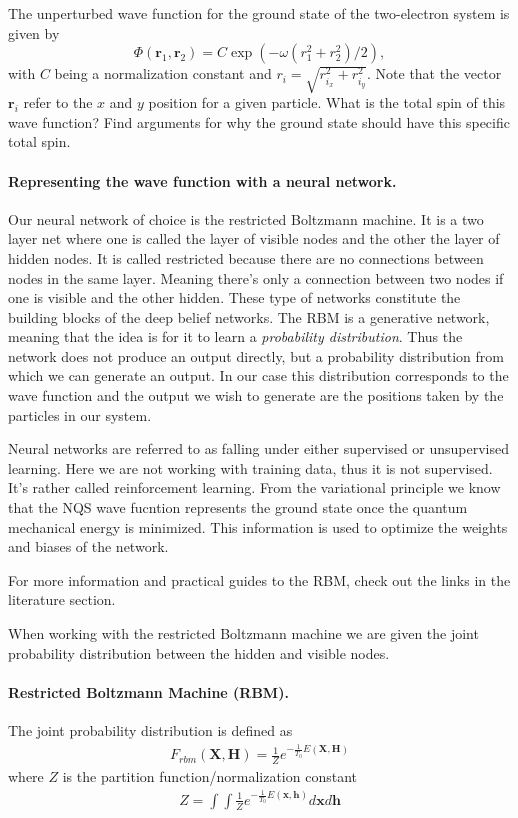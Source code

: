 \documentclass[%
oneside,                 %
final,                   %
10pt]{article}
\begin{document}
The unperturbed wave function for the ground state of the two-electron system is given by
\begin{equation*}
\Phi(\bm{r}_1,\bm{r}_2) = C\exp{\left(-\omega(r_1^2+r_2^2)/2\right)},
\end{equation*}
with $C$ being a normalization constant and $r_i = \sqrt{r_{i_x}^2+r_{i_y}^2}$. Note that the vector $\bm{r}_i$ 
refer to the $x$ and $y$ position for a given particle.
What is the total spin of this wave function? Find arguments for why the ground state should have
this specific total spin. 


\paragraph{Representing the wave function with a neural network.}
Our neural network of choice is the restricted Boltzmann machine. It
is a two layer net where one is called the layer of visible nodes and
the other the layer of hidden nodes. It is called restricted because
there are no connections between nodes in the same layer. Meaning
there's only a connection between two nodes if one is visible and the
other hidden. These type of networks constitute the building blocks of
the deep belief networks. The RBM is a
generative network, meaning that the idea is for it to learn a
\textit{probability distribution}. Thus the network does not produce
an output directly, but a probability distribution from which we can
generate an output. In our case this distribution corresponds to the
wave function and the output we wish to generate are the positions
taken by the particles in our system.

Neural networks are referred to as falling
under either supervised or unsupervised learning. Here we are not
working with training data, thus it is not supervised. It's rather
called reinforcement learning. From the variational principle we know
that the NQS wave fucntion represents the ground state once the
quantum mechanical energy is minimized. This information is used to
optimize the weights and biases of the network.

For more information and practical guides to the RBM, check out the links in the literature section.

When working with the restricted Boltzmann machine we are given the joint probability distribution between the hidden and visible nodes.

\paragraph{Restricted Boltzmann Machine (RBM).}
The joint probability distribution is defined as 
\begin{align}
	F_{rbm}(\mathbf{X},\mathbf{H}) = \frac{1}{Z} e^{-\frac{1}{T_0}E(\mathbf{X},\mathbf{H})}
\end{align}
where $Z$ is the partition function/normalization constant
\begin{align}
	Z = \int \int \frac{1}{Z} e^{-\frac{1}{T_0}E(\mathbf{x},\mathbf{h})} d\mathbf{x} d\mathbf{h}
\end{align}
\end{document}
